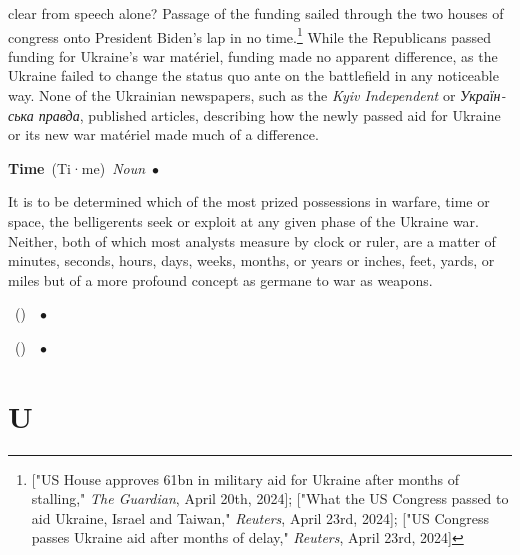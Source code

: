 \documentclass[10pt,a4paper,twoside]{article} %
\newcommand{\entry}[4]{\markboth{#1}{#1}\textbf{#1}\ {(#2)}\ \textit{#3}\ $\bullet$\ {#4}}  %
\begin{document}
\begin{multicols}{2}
{clear from speech alone? \newline \indent  Passage of the funding sailed through the two houses of congress onto President Biden's lap in no time.\footnote{["US House approves 61bn in military aid for Ukraine after months of stalling," \emph{The Guardian}, April 20th, 2024]; ["What the US Congress passed to aid Ukraine, Israel and Taiwan," \emph{Reuters}, April 23rd, 2024]; ["US Congress passes Ukraine aid after months of delay," \emph{Reuters}, April 23rd, 2024] } While the Republicans passed funding for Ukraine's war \textfrench{matériel}, funding made no apparent difference, as the Ukraine failed to change the status quo ante on the battlefield in any noticeable way. None of the Ukrainian newspapers, such as the \emph{Kyiv Independent} or \textukrainian{\emph{Українська правда}}, published articles, describing how the newly passed aid for Ukraine or its new war \textfrench{matériel} made much of a difference. 
}




\entry{Time} {Ti·me} {Noun} {

It is to be determined which of the most prized possessions in warfare, time or space, the belligerents seek or exploit at any given phase of the Ukraine war. Neither, both of which most analysts measure by clock or ruler, are a matter of minutes, seconds, hours, days, weeks, months, or years or inches, feet, yards, or miles but of a more profound concept as germane to war as weapons. 

}

\entry{} {} {} { 



}

\entry{} {} {} {


}


\end{multicols}


\section*{U}
\end{document}

